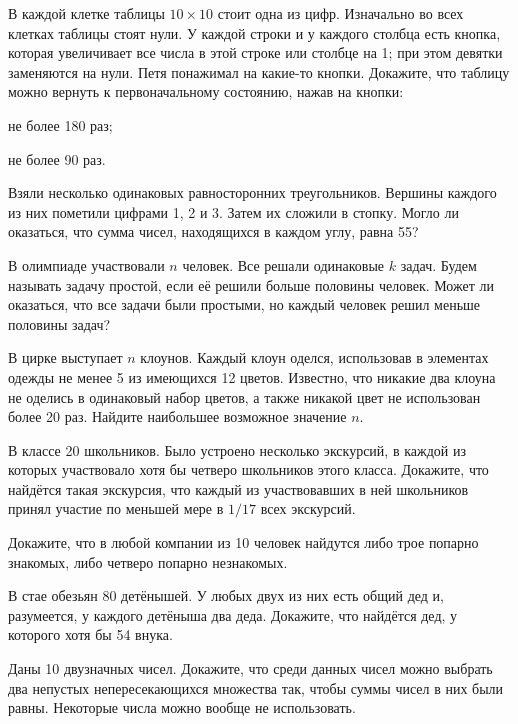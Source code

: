 \begin{problems}
\item В каждой клетке таблицы $10\times10$ стоит одна из цифр. Изначально во всех клетках таблицы стоят нули. У каждой строки и у каждого столбца есть кнопка, которая увеличивает все числа в этой строке или столбце на 1; при этом девятки заменяются на нули. Петя понажимал на какие-то кнопки. Докажите, что таблицу можно вернуть к первоначальному состоянию, нажав на кнопки:
\begin{parts}
  \item не более 180 раз;
  \item не более 90 раз.
\end{parts}

\item Взяли несколько одинаковых равносторонних треугольников. Вершины каждого из них пометили цифрами 1, 2 и 3. Затем их сложили в стопку. Могло ли оказаться, что сумма чисел, находящихся в каждом углу, равна 55?

\item В олимпиаде участвовали $n$ человек. Все решали одинаковые $k$ задач. Будем называть задачу простой, если её решили больше половины человек. Может ли оказаться, что все задачи были простыми, но каждый человек решил меньше половины задач?

\item В цирке выступает $n$ клоунов. Каждый клоун оделся, использовав в элементах одежды не менее 5 из имеющихся 12 цветов. Известно, что никакие два клоуна не оделись в одинаковый набор цветов, а также никакой цвет не использован более 20 раз. Найдите наибольшее возможное значение $n$.

\item В классе 20 школьников. Было устроено несколько экскурсий, в каждой из которых участвовало хотя бы четверо школьников этого класса. Докажите, что найдётся такая экскурсия, что каждый из участвовавших в ней школьников принял участие по меньшей мере в $1/17$ всех экскурсий.

\item Докажите, что в любой компании из 10 человек найдутся либо трое попарно знакомых, либо четверо попарно незнакомых.

\item В стае обезьян 80 детёнышей. У любых двух из них есть общий дед и, разумеется, у каждого детёныша два деда. Докажите, что найдётся дед, у которого хотя бы 54 внука.

\item Даны 10 двузначных чисел. Докажите, что среди данных чисел можно выбрать два непустых непересекающихся множества так, чтобы суммы чисел в них были равны. Некоторые числа можно вообще не использовать.


\end{problems}
